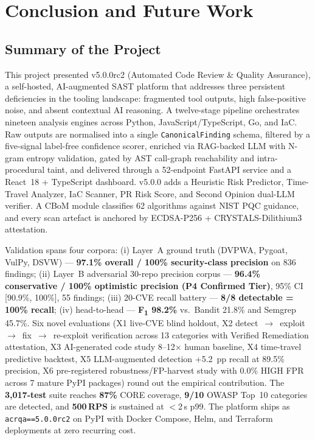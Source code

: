 \chapter{Conclusion and Future Work}
\label{ch:conclusion}

\section{Summary of the Project}

This project presented \ACRQA{} v5.0.0rc2 (Automated Code Review \& Quality Assurance), a self-hosted, AI-augmented SAST platform that addresses three persistent deficiencies in the tooling landscape: fragmented tool outputs, high false-positive noise, and absent contextual AI reasoning. A twelve-stage pipeline orchestrates nineteen analysis engines across Python, JavaScript/TypeScript, Go, and IaC. Raw outputs are normalised into a single \texttt{CanonicalFinding} schema, filtered by a five-signal label-free confidence scorer, enriched via RAG-backed LLM with N-gram entropy validation, gated by AST call-graph reachability and intra-procedural taint, and delivered through a 52-endpoint FastAPI service and a React~18 + TypeScript dashboard. v5.0.0 adds a Heuristic Risk Predictor, Time-Travel Analyzer, IaC Scanner, PR Risk Score, and Second Opinion dual-LLM verifier. A CBoM module classifies 62 algorithms against NIST PQC guidance, and every scan artefact is anchored by ECDSA-P256 + CRYSTALS-Dilithium3 attestation.

Validation spans four corpora: (i) Layer~A ground truth (DVPWA, Pygoat, VulPy, DSVW) --- \textbf{97.1\% overall / 100\% security-class precision} on 836 findings; (ii) Layer~B adversarial 30-repo precision corpus --- \textbf{96.4\% conservative / 100\% optimistic precision (P4 Confirmed Tier)}, 95\% CI [90.9\%, 100\%], 55 findings; (iii) 20-CVE recall battery --- \textbf{8/8 detectable = 100\% recall}; (iv) head-to-head --- \textbf{F\textsubscript{1} 98.2\%} vs.\ Bandit 21.8\% and Semgrep 45.7\%. Six novel evaluations (X1 live-CVE blind holdout, X2 detect~$\to$~exploit~$\to$~fix~$\to$~re-exploit verification across 13 categories with Verified Remediation attestation, X3 AI-generated code study 8--12$\times$ human baseline, X4 time-travel predictive backtest, X5 LLM-augmented detection +5.2~pp recall at 89.5\% precision, X6 pre-registered robustness/FP-harvest study with 0.0\% HIGH FPR across 7 mature PyPI packages) round out the empirical contribution. The \textbf{3,017-test} suite reaches \textbf{87\%} CORE coverage, \textbf{9/10} OWASP Top~10 categories are detected, and \textbf{500\,RPS} is sustained at $<$2\,s p99. The platform ships as \texttt{acrqa==5.0.0rc2} on PyPI with Docker Compose, Helm, and Terraform deployments at zero recurring cost.

